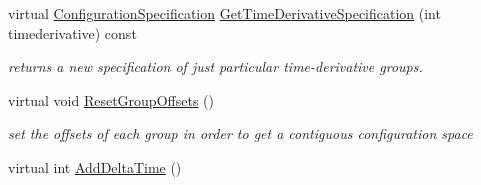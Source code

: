 \begin{DoxyCompactItemize}
virtual \hyperlink{classOpenRAVE_1_1ConfigurationSpecification}{ConfigurationSpecification} \hyperlink{classOpenRAVE_1_1ConfigurationSpecification_a74cafdbc27d652fd09ab0c51edfb71c2}{GetTimeDerivativeSpecification} (int timederivative) const 
\begin{DoxyCompactList}\small\item\em returns a new specification of just particular time-\/derivative groups. \item\end{DoxyCompactList}\item 
\hypertarget{classOpenRAVE_1_1ConfigurationSpecification_a0a1d4389aa95904a153f0236f7deaccf}{
virtual void \hyperlink{classOpenRAVE_1_1ConfigurationSpecification_a0a1d4389aa95904a153f0236f7deaccf}{ResetGroupOffsets} ()}
\label{classOpenRAVE_1_1ConfigurationSpecification_a0a1d4389aa95904a153f0236f7deaccf}

\begin{DoxyCompactList}\small\item\em set the offsets of each group in order to get a contiguous configuration space \item\end{DoxyCompactList}\item 
\hypertarget{classOpenRAVE_1_1ConfigurationSpecification_a4997560805c0054dccdc9c9efa571a32}{
virtual int \hyperlink{classOpenRAVE_1_1ConfigurationSpecification_a4997560805c0054dccdc9c9efa571a32}{AddDeltaTime} ()}
\label{classOpenRAVE_1_1ConfigurationSpecification_a4997560805c0054dccdc9c9efa571a32}


\end{DoxyCompactItemize}
